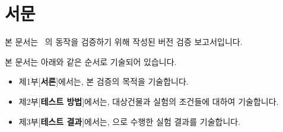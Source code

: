 \documentclass[oneside,openany,a4paper,12pt]{book}
\begin{document}
\pagestyle{plain} 



\section*{서문}
본 문서는 \simulator~\releaseversion 의 동작을 검증하기 위해 작성된 버전 검증 보고서입니다.

본 문서는 아래와 같은 순서로 기술되어 있습니다.
\begin{itemize}
  \item 제1부[{\bfseries 서론}]에서는, 본 검증의 목적을 기술합니다.
  \item 제2부[{\bfseries 테스트 방법}]에서는, 대상건물과 실험의 조건들에 대하여 기술합니다.
  \item 제3부[{\bfseries 테스트 결과}]에서는, \releaseversion 으로 수행한 실험 결과를 기술합니다.
\end{itemize}

\tableofcontents       
\listoffigures          
\listoftables          


\clearpage      
{}

\mainmatter





\backmatter



\end{document}
